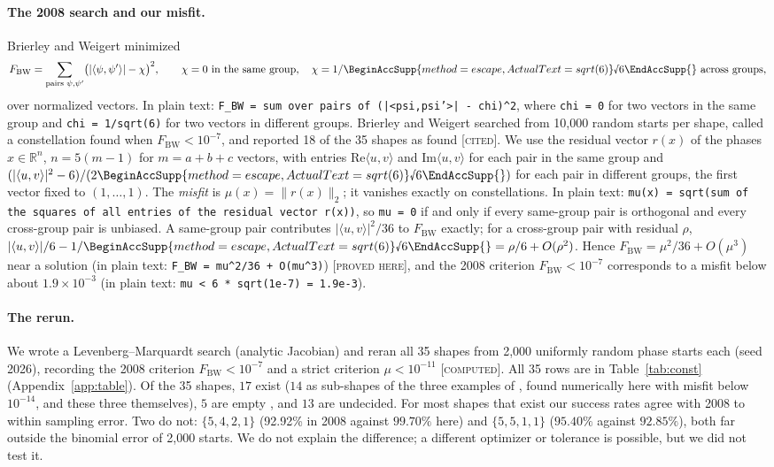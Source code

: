 \documentclass[11pt]{article}
\newcommand{\rnum}[1]{\BeginAccSupp{method=escape,ActualText=sqrt(#1)}\text{\textsurd}#1\EndAccSupp{}}
\newcommand{\rsix}{\rnum{6}}
\newcommand{\R}{\mathbb{R}}
\newcommand{\ip}[2]{\langle #1,#2\rangle}
\newcommand{\abs}[1]{\lvert #1\rvert}
\newcommand{\norm}[1]{\lVert #1\rVert}
\newcommand{\st}[1]{\textsc{[#1]}}
\newcommand{\stproved}{\st{proved here}}
\newcommand{\stcomp}{\st{computed}}
\newcommand{\stcited}{\st{cited}}
\theoremstyle{definition}
\theoremstyle{remark}
\begin{document}
{\raggedright \paragraph{The 2008 search and our misfit.} Brierley and Weigert minimized
\[F_{\mathrm{BW}}=\sum_{\text{pairs }\psi,\psi'}\bigl(\abs{\ip{\psi}{\psi'}}-\chi\bigr)^2,\qquad \chi=0\ \text{in the
same group},\quad \chi=1/\rnum{6}\ \text{across groups},\]
over normalized vectors. In plain text: \texttt{F\_BW = sum over pairs of (|<psi,psi'>| -~chi)\textasciicircum{}2}, where \texttt{chi = 0} for two vectors in the same group
and \texttt{chi = 1/sqrt(6)} for two vectors in different groups. Brierley and Weigert searched from 10{,}000 random starts per shape, called a constellation found when $F_{\mathrm{BW}}<10^{-7}$,
and reported 18 of the 35 shapes as found \cite{BW08} \stcited. We use the residual vector $r(x)$ of the phases
$x\in\R^{n}$, $n=5(m-1)$ for $m=a+b+c$ vectors, with entries $\mathrm{Re}\ip uv$ and $\mathrm{Im}\ip uv$ for each pair in
the same group and $(\abs{\ip uv}^2-6)/(2\rsix)$ for each pair in different groups, the first vector fixed to
$(1,\dots,1)$. The \emph{misfit} is $\mu(x)=\norm{r(x)}_2$; it vanishes
exactly on constellations. In plain text: \texttt{mu(x) = sqrt(sum of the squares of all entries of the residual vector r(x))}, so
\texttt{mu = 0} if and only if every same-group pair is orthogonal and every cross-group pair is unbiased. A same-group pair contributes $\abs{\ip uv}^2/36$ to $F_{\mathrm{BW}}$ exactly; for a
cross-group pair with residual $\rho$, $\abs{\ip uv}/6-1/\rsix=\rho/6+O(\rho^2)$. Hence
$F_{\mathrm{BW}}=\mu^2/36+O(\mu^3)$ near a solution (in plain text: \texttt{F\_BW = mu\textasciicircum{}2/36 + O(mu\textasciicircum{}3)}) \stproved, and the 2008
criterion $F_{\mathrm{BW}}<10^{-7}$ corresponds to a misfit below about $1.9\times10^{-3}$ (in plain text: \texttt{mu < 6 * sqrt(1e-7) = 1.9e-3}).\par}

\paragraph{The rerun.} We wrote a Levenberg--Marquardt search (analytic Jacobian) and reran all 35
shapes from 2{,}000 uniformly random phase starts each (seed 2026),
recording the 2008 criterion $F_{\mathrm{BW}}<10^{-7}$ and a strict criterion $\mu<10^{-11}$ \stcomp. All 35 rows are in Table~\ref{tab:const} (Appendix~\ref{app:table}). Of the 35 shapes, $17$
exist ($14$ as sub-shapes of the three examples of \cite{CWT}, found numerically here with misfit below $10^{-14}$, and these
three themselves), $5$ are empty \cite{CWT}, and $13$ are undecided. For most shapes that exist our success rates agree with 2008 to
within sampling error. Two do not: $\{5,4,2,1\}$ (92.92\% in 2008 against $99.70\%$ here) and $\{5,5,1,1\}$ ($95.40\%$
against $92.85\%$), both far outside the binomial error of 2{,}000 starts. We do not explain the difference; a different
optimizer or tolerance is possible, but we did not test it.
\end{document}
